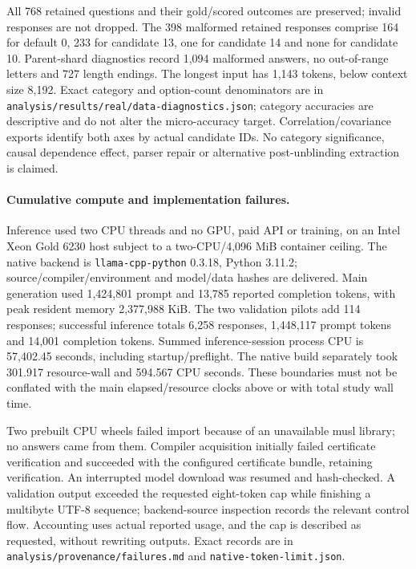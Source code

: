 All 768 retained questions and their gold/scored outcomes are preserved; invalid responses are not dropped. The 398 malformed retained responses comprise 164 for default 0, 233 for candidate 13, one for candidate 14 and none for candidate 10. Parent-shard diagnostics record 1,094 malformed answers, no out-of-range letters and 727 length endings. The longest input has 1,143 tokens, below context size 8,192. Exact category and option-count denominators are in \texttt{analysis/results/real/data-diagnostics.json}; category accuracies are descriptive and do not alter the micro-accuracy target. Correlation/covariance exports identify both axes by actual candidate IDs. No category significance, causal dependence effect, parser repair or alternative post-unblinding extraction is claimed.

\paragraph{Cumulative compute and implementation failures.}
Inference used two CPU threads and no GPU, paid API or training, on an Intel Xeon Gold 6230 host subject to a two-CPU/4,096 MiB container ceiling. The native backend is \texttt{llama-cpp-python} 0.3.18, Python 3.11.2; source/compiler/environment and model/data hashes are delivered. Main generation used 1,424,801 prompt and 13,785 reported completion tokens, with peak resident memory 2,377,988 KiB. The two validation pilots add 114 responses; successful inference totals 6,258 responses, 1,448,117 prompt tokens and 14,001 completion tokens. Summed inference-session process CPU is 57,402.45 seconds, including startup/preflight. The native build separately took 301.917 resource-wall and 594.567 CPU seconds. These boundaries must not be conflated with the main elapsed/resource clocks above or with total study wall time.

Two prebuilt CPU wheels failed import because of an unavailable musl library; no answers came from them. Compiler acquisition initially failed certificate verification and succeeded with the configured certificate bundle, retaining verification. An interrupted model download was resumed and hash-checked. A validation output exceeded the requested eight-token cap while finishing a multibyte UTF-8 sequence; backend-source inspection records the relevant control flow. Accounting uses actual reported usage, and the cap is described as requested, without rewriting outputs. Exact records are in \texttt{analysis/provenance/failures.md} and \texttt{native-token-limit.json}.

